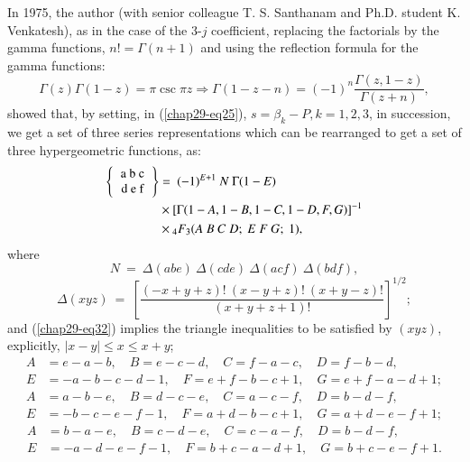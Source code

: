 In 1975, the author (with senior colleague T. S. Santhanam and Ph.D. student K. Venkatesh), as in the case of the 3-$j$ coefficient, replacing the factorials by the gamma functions, $n! = \Gamma(n+1)$ and using the reflection formula for the gamma functions:
\begin{equation}
\Gamma(z)\Gamma(1-z) = \pi \csc \pi z \Rightarrow \Gamma(1-z-n)=(-1)^n \frac{\Gamma(z, 1-z)}{\Gamma(z+n)}, \label{chap29-eq29}
\end{equation}
showed that, by setting, in (\eqref{chap29-eq25}), $s=\beta_k-P, k=1,2,3$, in succession, we get a set of three series representations which can be rearranged to get a set of three hypergeometric functions, as:
\begin{equation}
\begin{split}
\left\{ 
\begin{tabular} {c} 
a\ b\ c\\ d\ e\ f \\ \end{tabular} 
\right\} 
& =\ (-1)^{E+1}\ N\ \Gamma(1-E)\\
& \times [\Gamma(1-A, 1-B, 1-C, 1-D, F, G)]^{-1}\\
& \times {}_4F_3(A\ B\ C\ D;\ E\ F\ G;\ 1), \label{chap29-eq30}
\end{split}
\end{equation}
where
\begin{equation}
N\ =\ \Delta(abe)\ \Delta(cde)\ \Delta(acf)\ \Delta(bdf), \label{chap29-eq31}
\end{equation}
\begin{equation}
\Delta(xyz)\ =\  \left[ \frac{(-x+y+z)!\ (x-y+z)!\ (x+y-z)!}{(x+y+z+1)!} \right]^{1/2}; \label{chap29-eq32}
\end{equation}
and (\eqref{chap29-eq32}) implies the triangle inequalities to be satisfied by $(xyz)$, explicitly, $|x-y| \leq x \leq x+y$; 
\begin{equation}
\begin{split}
A & = e-a-b, \quad B=e-c-d, \quad C=f-a-c, \quad D=f-b-d,\\
E & = -a-b-c-d-1, \quad F=e+f-b-c+1, \quad G=e+f-a-d+1;\label{chap29-eq33}
\end{split}
\end{equation}
\begin{equation}
\begin{split}
A & = a-b-e, \quad B=d-c-e, \quad C=a-c-f, \quad D=b-d-f,\\
E & = -b-c-e-f-1, \quad F=a+d-b-c+1, \quad G=a+d-e-f+1; \label{chap29-eq34}
\end{split}
\end{equation}
\begin{equation}
\begin{split}
A & = b-a-e, \quad B=c-d-e, \quad C=c-a-f, \quad D=b-d-f,\\
E & = -a-d-e-f-1, \quad F=b+c-a-d+1, \quad G=b+c-e-f+1. \label{chap29-eq35}
\end{split}
\end{equation}

